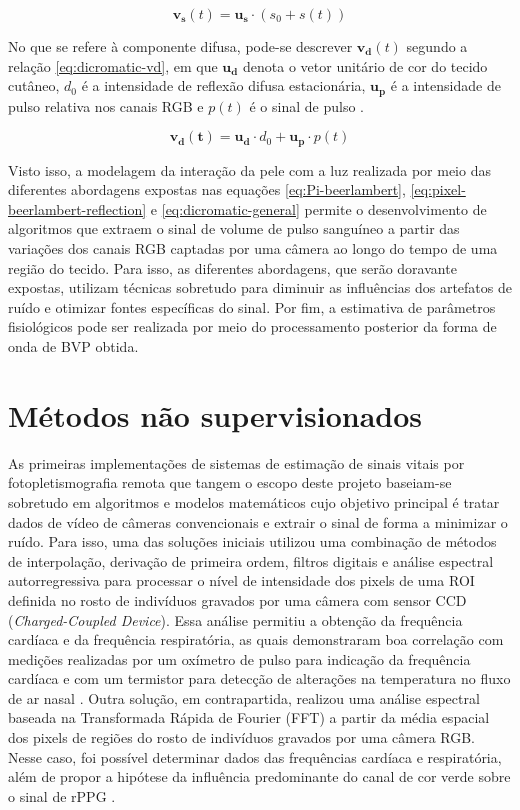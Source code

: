 \begin{equation}
    \label{eq:dicromatic-vs}
    \bm{v_s}(t) = \bm{u_s} \cdot (s_0 + s(t))
\end{equation}

No que se refere à componente difusa,  pode-se descrever \(\bm{v_d}(t)\) segundo a relação \ref{eq:dicromatic-vd}, em que \(\bm{u_d}\) denota o vetor unitário de cor do tecido cutâneo, \(d_0\) é a intensidade de reflexão difusa estacionária, \(\bm{u_p}\) é a intensidade de pulso relativa nos canais RGB e \(p(t)\) é o sinal de pulso \cite{wang2016algorithmic}.

\begin{equation}
    \label{eq:dicromatic-vd}
    \bm{v_d(t)} = \bm{u_d} \cdot d_0 + \bm{u_p} \cdot p(t)
\end{equation}

Visto isso, a modelagem da interação da pele com a luz realizada por meio das diferentes abordagens expostas nas equações \ref{eq:Pi-beerlambert}, \ref{eq:pixel-beerlambert-reflection} e \ref{eq:dicromatic-general} permite o desenvolvimento de algoritmos que extraem o sinal de volume de pulso sanguíneo a partir das variações dos canais RGB captadas por uma câmera ao longo do tempo de uma região do tecido. Para isso, as diferentes abordagens, que serão doravante expostas, utilizam técnicas sobretudo para diminuir as influências dos artefatos de ruído e otimizar fontes específicas do sinal. Por fim, a estimativa de parâmetros fisiológicos pode ser realizada por meio do processamento posterior da forma de onda de BVP obtida.

\section{Métodos não supervisionados}

As primeiras implementações de sistemas de estimação de sinais vitais por fotopletismografia remota que tangem o escopo deste projeto baseiam-se sobretudo em algoritmos e modelos matemáticos cujo objetivo principal é tratar dados de vídeo de câmeras convencionais e extrair o sinal de forma a minimizar o ruído. Para isso, uma das soluções iniciais utilizou uma combinação de métodos de interpolação, derivação de primeira ordem, filtros digitais e análise espectral autorregressiva para processar o nível de intensidade dos pixels de uma ROI definida no rosto de indivíduos gravados por uma câmera com sensor CCD (\textit{Charged-Coupled Device}). Essa análise permitiu a obtenção da frequência cardíaca e da frequência respiratória, as quais demonstraram boa correlação com medições realizadas por um oxímetro de pulso para indicação da frequência cardíaca e com um termistor para detecção de alterações na temperatura no fluxo de ar nasal \cite{takano2007heart}. Outra solução, em contrapartida, realizou uma análise espectral baseada na Transformada Rápida de Fourier (FFT) a partir da média espacial dos pixels de regiões do rosto de indivíduos gravados por uma câmera RGB. Nesse caso, foi possível determinar dados das frequências cardíaca e respiratória, além de propor a hipótese da influência predominante do canal de cor verde sobre o sinal de rPPG  \cite{verkruysse2008remote}. 

